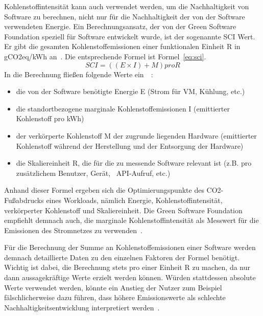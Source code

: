 Kohlenstoffintensität kann auch verwendet werden, um die Nachhaltigkeit von Software zu berechnen, nicht nur für die Nachhaltigkeit der von der Software verwendeten Energie.
Ein Berechnungsansatz, der von der Green Software Foundation speziell für Software entwickelt wurde, ist der sogenannte \ac{SCI} Wert.
Er gibt die gesamten Kohlenstoffemissionen einer funktionalen Einheit R in g\ac{CO2}eq/\ac{kWh} an~\cite{GreenSoftwareFoundation.2022}.
Die entsprechende Formel ist Formel~\ref{eq:sci}.
\begin{equation}
 \label{eq:sci}
 SCI = ((E \times I) + M) pro R
\end{equation}
In die Berechnung fließen folgende Werte ein~\cite{Buchanan.2023}~\cite{GreenSoftwareFoundation.2022}:
\begin{itemize}
 \item die von der Software benötigte Energie E (Strom für \ac{VM}, Kühlung, etc.)
 \item die standortbezogene marginale Kohlenstoffemissionen I (emittierter Kohlenstoff pro \ac{kWh})
 \item der verkörperte Kohlenstoff M der zugrunde liegenden Hardware (emittierter Kohlenstoff während der Herstellung und der Entsorgung der Hardware)
 \item die Skaliereinheit R, die für die zu messende Software relevant ist (z.B. pro zusätzlichem Benutzer, Gerät, ~\ac{API}-Aufruf, etc.)
\end{itemize}
Anhand dieser Formel ergeben sich die Optimierungspunkte des \ac{CO2}-Fußabdrucks eines Workloads, nämlich Energie, Kohlenstoffintensität, verkörperter Kohlenstoff und Skaliereinheit.
Die Green Software Foundation empfiehlt demnach auch, die marginale Kohlenstoffintensität als Messwert für die Emissionen des Stromnetzes zu verwenden~\cite{GreenSoftwareFoundation.2022b}.

Für die Berechnung der Summe an Kohlenstoffemissionen einer Software werden demnach detaillierte Daten zu den einzelnen Faktoren der Formel benötigt.
Wichtig ist dabei, die Berechnung stets pro einer Einheit R zu machen, da nur dann aussagekräftige Werte erzielt werden können.
Würden stattdessen absolute Werte verwendet werden, könnte ein Anstieg der Nutzer zum Beispiel fälschlicherweise dazu führen, dass höhere Emissionswerte als schlechte Nachhaltigkeitsentwicklung interpretiert werden~\cite{GreenSoftwareFoundation.2022}.

